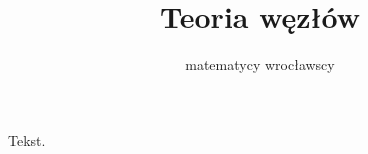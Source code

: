 \documentclass[a4paper, fleqn]{extarticle}
\title{Teoria węzłów}
\author{matematycy wrocławscy}
\numberwithin{dummy}{section}
\begin{document}
\maketitle
\tableofcontents

Tekst.
\end{document}

